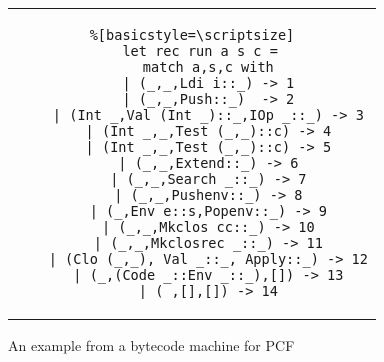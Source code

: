 \begin{figure}%
\centering
\begin{tabular}{c} %
\begin{lstlisting}%[basicstyle=\scriptsize]
  let rec run a s c =
    match a,s,c with
    | (_,_,Ldi i::_) -> 1
    | (_,_,Push::_)  -> 2
    | (Int _,Val (Int _)::_,IOp _::_) -> 3
    | (Int _,_,Test (_,_)::c) -> 4
    | (Int _,_,Test (_,_)::c) -> 5
    | (_,_,Extend::_) -> 6
    | (_,_,Search _::_) -> 7
    | (_,_,Pushenv::_) -> 8
    | (_,Env e::s,Popenv::_) -> 9
    | (_,_,Mkclos cc::_) -> 10
    | (_,_,Mkclosrec _::_) -> 11
    | (Clo (_,_), Val _::_, Apply::_) -> 12
    | (_,(Code _::Env _::_),[]) -> 13
    | (_,[],[]) -> 14
\end{lstlisting}
\end{tabular}
\caption{An example from a bytecode machine for PCF}
\label{fig:pcf}
\end{figure}

